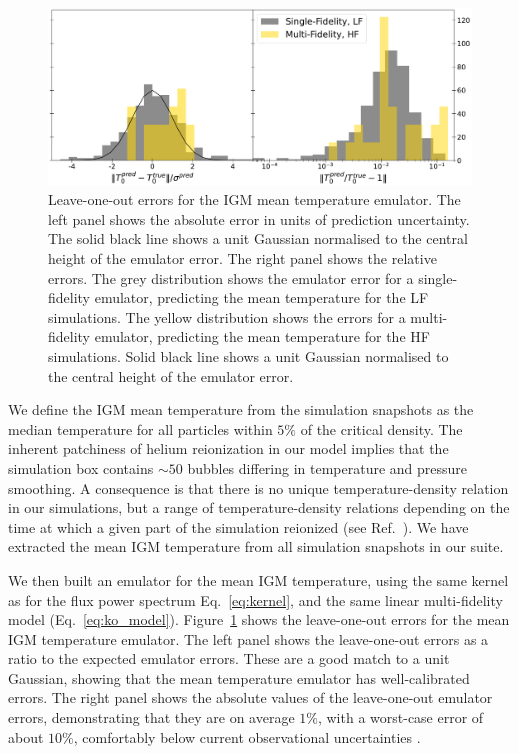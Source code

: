 \documentclass[a4paper,11pt]{article}
\begin{document}
\begin{figure}
    \centering
    \includegraphics[width=\textwidth]{figures/t0emu_errors.pdf}
    \caption{\label{fig:t0_error}
    Leave-one-out errors for the IGM mean temperature emulator.
    The left panel shows the absolute error in units of prediction uncertainty. The solid black line shows a unit Gaussian normalised to the central height of the emulator error. The right panel shows the relative errors.
    The grey distribution shows the emulator error for a single-fidelity emulator, predicting the mean temperature for the LF simulations.
    The yellow distribution shows the errors for a multi-fidelity emulator, predicting the mean temperature for the HF simulations. Solid black line shows a unit Gaussian normalised to the central height of the emulator error.
    }
\end{figure}

We define the IGM mean temperature from the simulation snapshots as the median temperature for all particles within $5\%$ of the critical density.
The inherent patchiness of helium reionization in our model implies that the simulation box contains $\sim 50$ bubbles differing in temperature and pressure smoothing. A consequence is that there is no unique temperature-density relation in our simulations, but a range of temperature-density relations depending on the time at which a given part of the simulation reionized (see Ref.~\cite{UptonSanderbeck:2020}). We have extracted the mean IGM temperature from all simulation snapshots in our suite.

We then built an emulator for the mean IGM temperature, using the same kernel as for the flux power spectrum Eq.~\ref{eq:kernel}, and the same linear multi-fidelity model (Eq.~\ref{eq:ko_model}). Figure~\ref{fig:t0_error} shows the leave-one-out errors for the mean IGM temperature emulator. The left panel shows the leave-one-out errors as a ratio to the expected emulator errors. These are a good match to a unit Gaussian, showing that the mean temperature emulator has well-calibrated errors. The right panel shows the absolute values of the leave-one-out emulator errors, demonstrating that they are on average $1\%$, with a worst-case error of about $10\%$, comfortably below current observational uncertainties \cite{Gaikwad:2020}.
\end{document}
